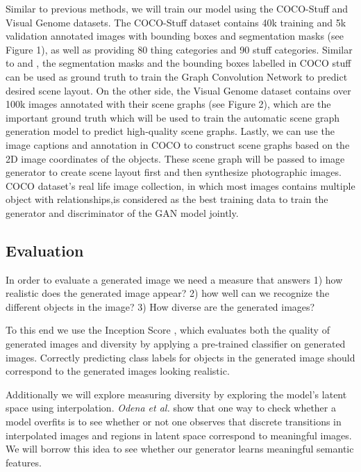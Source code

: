 \documentclass{article}
\begin{document}
Similar to previous methods, we will train our model using the COCO-Stuff \cite{cocostuff} and Visual Genome \cite{visualgen} datasets. The COCO-Stuff dataset contains 40k training and 5k validation annotated images with bounding boxes and segmentation masks (see Figure 1), as well as providing 80 thing categories and 90 stuff categories. Similar to \cite{sg2im} and \cite{sg2imgcontext}, the segmentation masks and the bounding boxes labelled in COCO stuff can be used as ground truth to train the Graph Convolution Network to predict desired scene layout. On the other side, the Visual Genome dataset contains over 100k images annotated with their scene graphs (see Figure 2), which are the important ground truth which will be used to train the automatic scene graph generation model to predict high-quality scene graphs. Lastly, we can use the image captions and annotation in COCO to construct scene graphs based on the 2D image coordinates of the objects. These scene graph will be passed to image generator to create scene layout first and then synthesize photographic images. COCO dataset's real life image collection, in which most images contains multiple object with relationships,is considered as the best training data to train the generator and discriminator of the GAN model jointly.

\subsection{Evaluation}

In order to evaluate a generated image we need a measure that answers 1) how realistic does the generated image appear? 2) how well can we recognize the different objects in the image? 3) How diverse are the generated images?

To this end we use the Inception Score \cite{inception}, which evaluates both the quality of generated images and diversity by applying a pre-trained classifier on generated images. Correctly predicting class labels for objects in the generated image should correspond to the generated images looking realistic.

Additionally we will explore measuring diversity by exploring the model's latent space using interpolation. \textit{Odena et al.} \cite{auxgan} show that one way to check whether a model overfits is to see whether or not one observes that discrete transitions in interpolated images and regions in latent space correspond to meaningful images. We will borrow this idea to see whether our generator learns meaningful semantic features.
\end{document}
